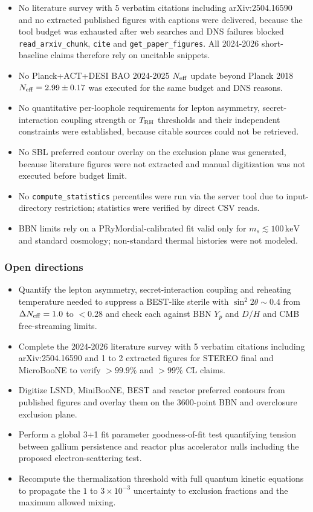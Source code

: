 \documentclass[11pt,a4paper]{article}
\begin{document}
\begin{itemize}
  \item No literature survey with 5 verbatim citations including arXiv:2504.16590 and no extracted published figures with captions were delivered, because the tool budget was exhausted after web searches and DNS failures blocked \texttt{read\_\allowbreak{}arxiv\_\allowbreak{}chunk}, \texttt{cite} and \texttt{get\_\allowbreak{}paper\_\allowbreak{}figures}. All 2024-2026 short-baseline claims therefore rely on uncitable snippets.
  \item No Planck+ACT+DESI BAO 2024-2025 $N_{\rm eff}$ update beyond Planck 2018 $N_{\rm eff} = 2.99 \pm 0.17$ was executed for the same budget and DNS reasons.
  \item No quantitative per-loophole requirements for lepton asymmetry, secret-interaction coupling strength or $T_{\rm RH}$ thresholds and their independent constraints were established, because citable sources could not be retrieved.
  \item No SBL preferred contour overlay on the exclusion plane was generated, because literature figures were not extracted and manual digitization was not executed before budget limit.
  \item No \texttt{compute\_\allowbreak{}statistics} percentiles were run via the server tool due to input-directory restriction; statistics were verified by direct CSV reads.
  \item BBN limits rely on a PRyMordial-calibrated fit valid only for $m_s \lesssim 100\,\mathrm{keV}$ and standard cosmology; non-standard thermal histories were not modeled.
\end{itemize}
\subsubsection*{Open directions}
\begin{itemize}
  \item Quantify the lepton asymmetry, secret-interaction coupling and reheating temperature needed to suppress a BEST-like sterile with $\sin^2 2\theta \sim 0.4$ from $\Delta N_{\rm eff} = 1.0$ to $<0.28$ and check each against BBN $Y_p$ and $D/H$ and CMB free-streaming limits.
  \item Complete the 2024-2026 literature survey with 5 verbatim citations including arXiv:2504.16590 and 1 to 2 extracted figures for STEREO final and MicroBooNE to verify $>99.9\%$ and $>99\%$ CL claims.
  \item Digitize LSND, MiniBooNE, BEST and reactor preferred contours from published figures and overlay them on the 3600-point BBN and overclosure exclusion plane.
  \item Perform a global 3+1 fit parameter goodness-of-fit test quantifying tension between gallium persistence and reactor plus accelerator nulls including the proposed electron-scattering test.
  \item Recompute the thermalization threshold with full quantum kinetic equations to propagate the $1$ to $3 \times 10^{-3}$ uncertainty to exclusion fractions and the maximum allowed mixing.
\end{itemize}
\end{document}
